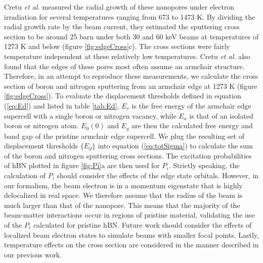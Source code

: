 \documentclass[twoside,twocolumn,9pt]{article}
\begin{document}
Cretu \textit{et al.} measured the radial growth of these nanopores under electron
irradiation for several temperatures ranging from 673 to 1473 K.
\cite{Cretu2015}
By dividing the radial growth rate by the beam current, they estimated the
sputtering cross section to be around 25 barn under both 30 and 60 keV beams at
temperatures of 1273 K and below (figure \ref{fig:edgeCross}c).
The cross sections were fairly temperature independent at these relatively low
temperatures.
Cretu \textit{et al.} also found that the edges of these pores most often assume an
armchair structure.
Therefore, in an attempt to reproduce these measurements, we calculate the
cross section of boron and nitrogen sputtering from an armchair edge at 1273 K
(figure \ref{fig:edgeCross}).
To evaluate the displacement thresholds defined in equation (\ref{eq:Ed}) and
listed in table \ref{tab:Ed}, $E_v$ is the free energy of the armchair edge
supercell with a single boron or nitrogen vacancy, while $E_a$ is that of an
isolated boron or nitrogen atom.
$E_0(0)$ and $E_g$ are then the calculated free energy and band gap of the
pristine armchair edge supercell.
We plug the resulting set of displacement thresholds $\{E_d\}$ into equation
(\ref{eq:totSigma}) to calculate the sum of the boron and nitrogen sputtering
cross sections.
The excitation probabilities of hBN plotted in figure \ref{fig:Pi}a are
then used for $P_i$.
Strictly speaking, the calculation of $P_i$ should consider the effects of the
edge state orbitals.
However, in our formalism, the beam electron is in a momentum eigenstate that
is highly delocalized in real space.
We therefore assume that the radius of the beam is much larger than that of the
nanopore.
This means that the majority of the beam-matter interactions occur in regions
of pristine material, validating the use of the $P_i$ calculated for pristine
hBN.
Future work should consider the effects of localized beam electron states to
simulate beams with smaller focal points.
Lastly, temperature effects on the cross section are considered in the manner
described in our previous work.\cite{Yoshimura2018}
\end{document}
